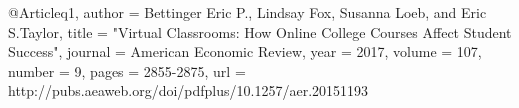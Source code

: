 @Article{q1,
	author = {Bettinger Eric P., Lindsay Fox, Susanna Loeb, and Eric S.Taylor},
	title = {"Virtual Classrooms: How Online College Courses Affect Student Success"},
	journal = {American Economic Review},
	year = {2017},
	volume = {107},
	number = {9},
	pages = {2855-2875},
	url = {http://pubs.aeaweb.org/doi/pdfplus/10.1257/aer.20151193}
}

